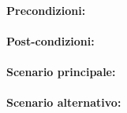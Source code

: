 \paragraph{Precondizioni:}

\paragraph{Post-condizioni:}

\paragraph{Scenario principale:}

\paragraph{Scenario alternativo:}
